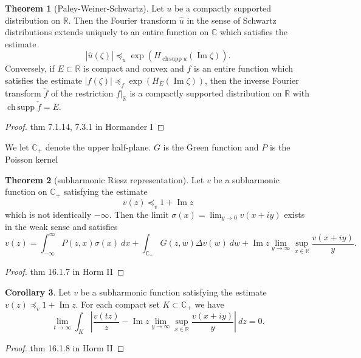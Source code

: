 \documentclass[12pt]{report}
\newcommand{\RR}{\mathbb{R}}
\newcommand{\CC}{\mathbb{C}}
\DeclareMathOperator*{\chsupp}{ch\,supp}
\renewcommand{\Im}{\operatorname{Im}}
\theoremstyle{definition}
\newtheorem{theorem}{Theorem}[chapter]
\newtheorem{corollary}[theorem]{Corollary}
\begin{document}
\begin{defintion}
\begin{theorem}[Paley-Weiner-Schwartz]
    Let $u$ be a compactly supported distribution on $\RR$. Then the Fourier transform $\hat u$ in the sense of Schwartz distributions extends uniquely to an entire function on $\CC$ which satisfies the estimate
    $$|\hat u(\zeta)| \preceq_u \exp(H_{\chsupp u}(\Im \zeta)).$$
    Conversely, if $E \subset \RR$ is compact and convex and $f$ is an entire function which satisfies the estimate $|f(\zeta)| \preceq_f \exp(H_E(\Im \zeta))$, then the inverse Fourier transform $\check f$ of the restriction $f|_\RR$ is a compactly supported distribution on $\RR$ with $\chsupp \check f = E$.
\end{theorem}
\begin{proof}
    thm 7.1.14, 7.3.1 in Hormander I
\end{proof}

We let $\CC_+$ denote the upper half-plane. $G$ is the Green function and $P$ is the Poisson kernel
\begin{theorem}[subharmonic Riesz representation]
    Let $v$ be a subharmonic function on $\CC_+$ satisfying the estimate
    $$v(z) \preceq_v 1 + \Im z$$
    which is not identically $-\infty$. Then the limit $\sigma(x) = \lim_{y \to 0} v(x + iy)$ exists in the weak sense and satisfies
    $$v(z) = \int_{-\infty}^\infty P(z, x) \sigma(x) ~dx + \int_{\CC_+} G(z, w) \Delta v(w) ~dw + \Im z \lim_{y \to \infty} \sup_{x \in \RR} \frac{v(x + iy)}{y}.$$
\end{theorem}
\begin{proof}
    thm 16.1.7 in Horm II
\end{proof}

\begin{corollary}
    Let $v$ be a subharmonic function satisfying the estimate $v(z) \preceq_v 1 + \Im z$. For each compact set $K \subset \overline{\CC_+}$ we have
$$\lim_{t \to \infty} \int_K \left|\frac{v(tz)}{z} - \Im z \lim_{y \to \infty} \sup_{x \in \RR} \frac{v(x + iy)}{y}\right| ~dz = 0.$$
\end{corollary}
\begin{proof}
    thm 16.1.8 in Horm II
\end{proof}


\end{defintion}
\end{document}
